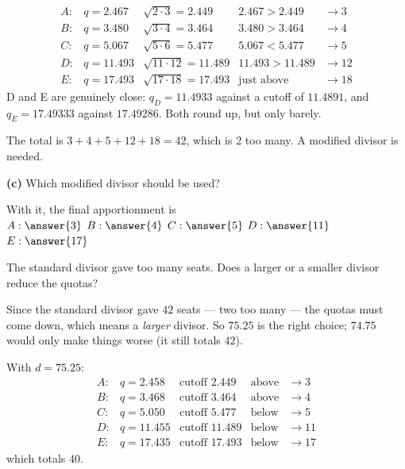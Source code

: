 \documentclass[12pt]{ximera}
\begin{document}
\begin{problem}
\begin{prompt}
\begin{feedback}
\[
\begin{array}{lllll}
A: & q = 2.467 & \sqrt{2\cdot 3}=2.449 & 2.467 > 2.449 & \to 3\\
B: & q = 3.480 & \sqrt{3\cdot 4}=3.464 & 3.480 > 3.464 & \to 4\\
C: & q = 5.067 & \sqrt{5\cdot 6}=5.477 & 5.067 < 5.477 & \to 5\\
D: & q = 11.493 & \sqrt{11\cdot 12}=11.489 & 11.493 > 11.489 & \to 12\\
E: & q = 17.493 & \sqrt{17\cdot 18}=17.493 & \text{just above} & \to 18
\end{array}
\]
D and E are genuinely close: $q_D = 11.4933$ against a cutoff of $11.4891$, and
$q_E = 17.49333$ against $17.49286$. Both round up, but only barely.

The total is $3+4+5+12+18 = 42$, which is $2$ too many. A modified divisor is needed.
\end{feedback}
\end{prompt}

\begin{prompt}
\textbf{(c)} Which modified divisor should be used?

\begin{multipleChoice}
\end{multipleChoice}

With it, the final apportionment is \\
$A: \answer{3}$ \quad $B: \answer{4}$ \quad $C: \answer{5}$ \quad $D: \answer{11}$
\quad $E: \answer{17}$

\begin{hint}
The standard divisor gave too many seats. Does a larger or a smaller divisor reduce
the quotas?
\end{hint}

\begin{feedback}
Since the standard divisor gave $42$ seats --- two too many --- the quotas must come
down, which means a \emph{larger} divisor. So $75.25$ is the right choice; $74.75$
would only make things worse (it still totals $42$).

With $d = 75.25$:
\[
\begin{array}{lllll}
A: & q = 2.458 & \text{cutoff } 2.449 & \text{above} & \to 3\\
B: & q = 3.468 & \text{cutoff } 3.464 & \text{above} & \to 4\\
C: & q = 5.050 & \text{cutoff } 5.477 & \text{below} & \to 5\\
D: & q = 11.455 & \text{cutoff } 11.489 & \text{below} & \to 11\\
E: & q = 17.435 & \text{cutoff } 17.493 & \text{below} & \to 17
\end{array}
\]
which totals $40$. \checkmark


\end{feedback}
\end{prompt}
\end{problem}
\end{document}
